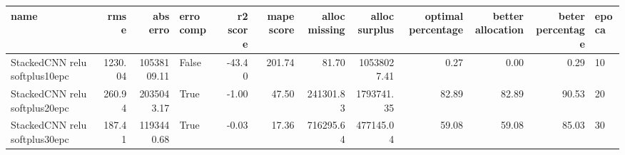 \begin{tabular}{lrrlrrrrrrrl}
\toprule
name & rmse & abs erro & erro comp & r2 score & mape score & alloc missing & alloc surplus & optimal percentage & better allocation & beter percentage & epoca \\
\midrule
StackedCNN relu softplus10epc & 1230.04 & 10538109.11 & False & -43.40 & 201.74 & 81.70 & 10538027.41 & 0.27 & 0.00 & 0.29 & 10 \\
StackedCNN relu softplus20epc & 260.94 & 2035043.17 & True & -1.00 & 47.50 & 241301.83 & 1793741.35 & 82.89 & 82.89 & 90.53 & 20 \\
StackedCNN relu softplus30epc & 187.41 & 1193440.68 & True & -0.03 & 17.36 & 716295.64 & 477145.04 & 59.08 & 59.08 & 85.03 & 30 \\
\bottomrule
\end{tabular}
